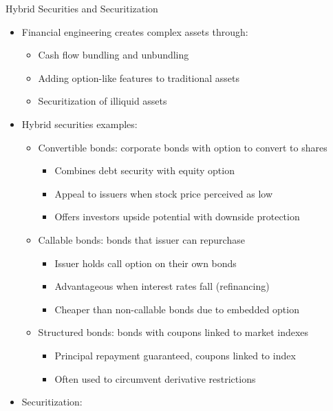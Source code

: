 \documentclass[10pt]{beamer}
\begin{document}
\begin{frame}{Hybrid Securities and Securitization}
  \begin{itemize}[<+->]
    \item Financial engineering creates complex assets through:
      \begin{itemize}
        \item Cash flow bundling and unbundling
        \item Adding option-like features to traditional assets
        \item Securitization of illiquid assets
      \end{itemize}
    \item Hybrid securities examples:
      \begin{itemize}
        \item Convertible bonds: corporate bonds with option to convert to shares
          \begin{itemize}
            \item Combines debt security with equity option
            \item Appeal to issuers when stock price perceived as low
            \item Offers investors upside potential with downside protection
          \end{itemize}
        \item Callable bonds: bonds that issuer can repurchase
          \begin{itemize}
            \item Issuer holds call option on their own bonds
            \item Advantageous when interest rates fall (refinancing)
            \item Cheaper than non-callable bonds due to embedded option
          \end{itemize}
        \item Structured bonds: bonds with coupons linked to market indexes
          \begin{itemize}
            \item Principal repayment guaranteed, coupons linked to index
            \item Often used to circumvent derivative restrictions
          \end{itemize}
      \end{itemize}
    \item Securitization:

\end{itemize}
\end{frame}
\end{document}
